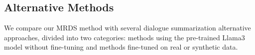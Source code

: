 


\subsection{Alternative Methods}



We compare our MRDS method with several dialogue summarization alternative approaches, divided into two categories: methods using the pre-trained Llama3 model without fine-tuning and methods fine-tuned on real or synthetic data.
